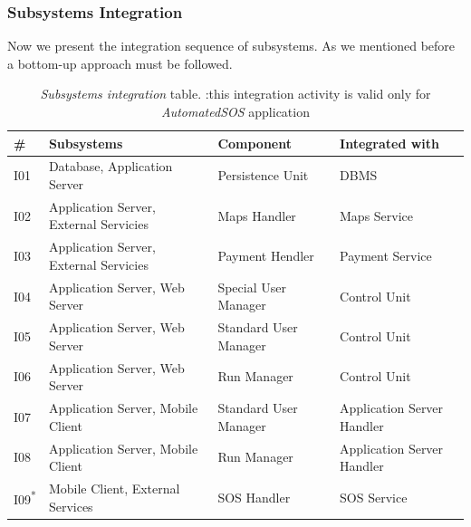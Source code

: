\subsubsection{Subsystems Integration}
Now we present the integration sequence of subsystems. As we mentioned before a bottom-up approach must be followed.

\begin{center}
\begin{table}[H]
\begin{tabular}{ | l | p{} | p{} | p{} |}
  \hline
    \textbf{\#} & \textbf{Subsystems} & \textbf{Component} & \textbf{Integrated with} \\ \hline
    I01 & Database, Application Server & Persistence Unit & DBMS \\ \hline
    I02 & Application Server, External Servicies & Maps Handler & Maps Service \\ \hline
    I03 & Application Server, External Servicies & Payment Hendler & Payment Service \\ \hline
    I04 & Application Server, Web Server & Special User Manager & Control Unit \\ \hline
    I05 & Application Server, Web Server & Standard User Manager & Control Unit \\ \hline
    I06 & Application Server, Web Server & Run Manager & Control Unit \\ \hline
    I07 & Application Server, Mobile Client & Standard User Manager & Application Server Handler \\ \hline
    I08 & Application Server, Mobile Client & Run Manager & Application Server Handler \\ \hline
    I09\textsuperscript{*} & Mobile Client, External Services & SOS Handler & SOS Service \\ \hline
\end{tabular}
\caption{\textit{Subsystems integration} table.
\text{*}:this integration activity is valid only for \textit{AutomatedSOS} application}
\label{table:subsystemsIntegrationTable}
\end{table}
\end{center}
